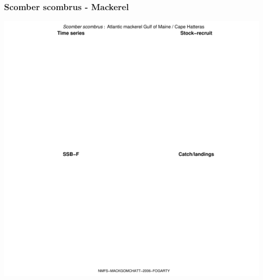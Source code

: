 \subsubsection{Scomber scombrus - Mackerel}
\begin{center}
\includegraphics[width=1.2\textwidth]{../R/figures/NMFS-MACKGOMCHATT-2006-FOGARTY.pdf}
\end{center}

